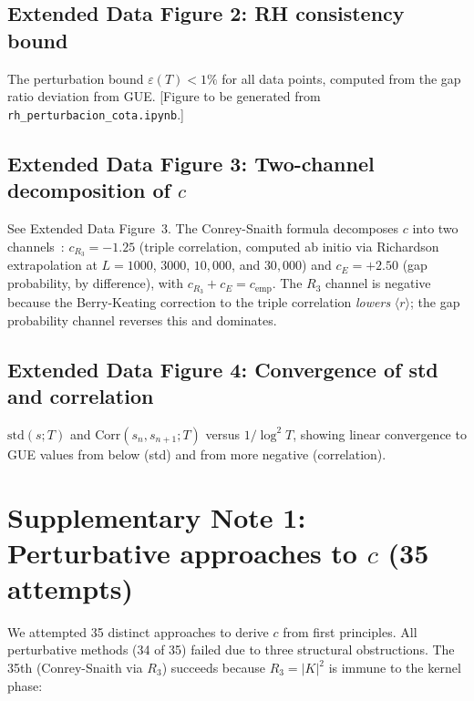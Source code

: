 \documentclass[10pt]{article}
\begin{document}
\subsection{Extended Data Figure 2: RH consistency bound}

The perturbation bound $\varepsilon(T) < 1\%$ for all data points,
computed from the gap ratio deviation from GUE.
[Figure to be generated from \texttt{rh\_perturbacion\_cota.ipynb}.]

\subsection{Extended Data Figure 3: Two-channel decomposition of $c$}

See Extended Data Figure~3.
The Conrey-Snaith formula decomposes $c$ into two channels~\cite{alarcon2026b}:
$c_{R_3} = -1.25$ (triple correlation, computed ab initio via Richardson
extrapolation at $L = 1000$, $3000$, $10{,}000$, and $30{,}000$) and $c_E = +2.50$
(gap probability, by difference), with $c_{R_3} + c_E = c_{\mathrm{emp}}$.
The $R_3$ channel is negative because the Berry-Keating correction to the
triple correlation \emph{lowers} $\langle r\rangle$; the gap probability
channel reverses this and dominates.

\subsection{Extended Data Figure 4: Convergence of std and correlation}

$\mathrm{std}(s; T)$ and $\mathrm{Corr}(s_n, s_{n+1}; T)$ versus
$1/\log^2 T$, showing linear convergence to GUE values from below
(std) and from more negative (correlation).


\section{Supplementary Note 1: Perturbative approaches to $c$ (35 attempts)}

We attempted 35 distinct approaches to derive $c$ from first
principles. All perturbative methods (34 of 35) failed due to three
structural obstructions. The 35th (Conrey-Snaith via $R_3$) succeeds
because $R_3 = |K|^2$ is immune to the kernel phase:
\end{document}
